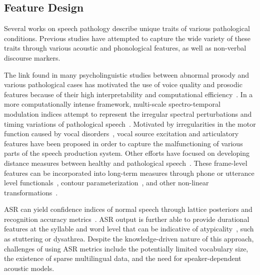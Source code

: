 \documentclass{article}
\begin{document}
\subsection{Feature Design}
Several works on speech pathology \cite{lass1989speech,berry1942speech,wingate1964standard} describe unique traits of various pathological conditions. 
Previous studies have attempted to capture the wide variety of these traits through various acoustic and phonological features, as well as non-verbal discourse markers.


The link found in many psycholinguistic studies between abnormal prosody and various pathological cases has motivated the use of voice quality and prosodic features because of their high interpretability and computational efficiency~\cite{van2010computational,tsanas2012novel,bone2014psychologist}. In a more computationally intense framework, multi-scale spectro-temporal modulation indices attempt to represent the irregular spectral perturbations and timing variations of pathological speech~\cite{liss2010discriminating,falk2012characterization,williamson2015automatic}. Motivated by irregularities in the motor function caused by vocal disorders~\cite{falk2012characterization,hahm2015parkinson}, vocal source excitation and articulatory features have been proposed in order to capture the malfunctioning of various parts of the speech production system. Other efforts have focused on developing distance measures between healthy and pathological speech~\cite{gu2005disordered}. These frame-level features can be incorporated into long-term measures through phone or utterance level functionals~\cite{kim2015automatic}, contour parameterization~\cite{kim2015automatic2}, and other non-linear transformations~\cite{kim2015automatic,an2015automatic,middag2011combining}.

ASR can yield confidence indices of normal speech through lattice posteriors and recognition accuracy metrics~\cite{kim2015automatic,zlotnik2015random,maier2009peaks,sharma2009universal,middag2009automated}. ASR output is further able to provide durational features at the syllable and word level that can be indicative of atypicality~\cite{an2015automatic,duez2006consonant}, such as stuttering or dysathrea. Despite the knowledge-driven nature of this approach, challenges of using ASR metrics include the potentially limited vocabulary size, the existence of sparse multilingual data, and the need for speaker-dependent acoustic models.
\end{document}
